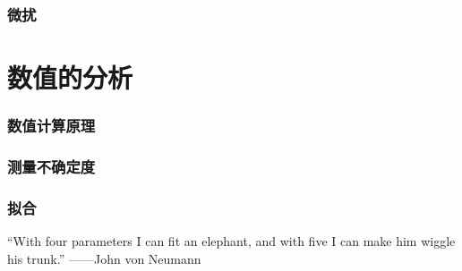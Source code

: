 \documentclass[10pt]{article}
\begin{document}
		\section{微扰}

	\part{数值的分析}
		\section{数值计算原理}
		\section{测量不确定度}
		\section{拟合}
			\begin{remark}
				``With four parameters I can fit an elephant, and with five I can make him wiggle his trunk.'' ——John von Neumann
			\end{remark}
\end{document}
